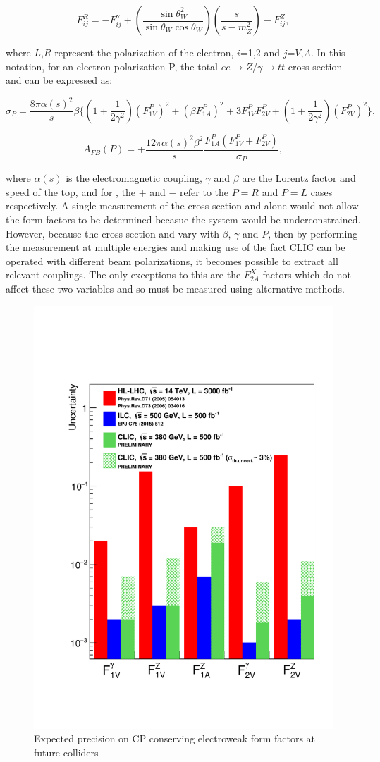 \begin{equation}
F_{ij}^{R} = -F_{ij}^{\gamma} +(\frac{\sin\theta_W^2}{\sin\theta_W\cos\theta_W})(\frac{s}{s-m_Z^2}) -F_{ij}^{Z},
\end{equation}

where $L$,$R$ represent the polarization of the electron, $i$=1,2 and $j$=$V$,$A$. In this notation, for an electron polarization P, the total $ee\rightarrow Z/\gamma\rightarrow tt$ cross section and \afb can be expressed as:

\begin{equation}
\sigma_P = \frac{8\pi\alpha(s)^2}{s}\beta \{(1 + \frac{1}{2\gamma^2})(F_{1V}^P)^2 +(\beta F_{1A}^P)^2 +3F_{1V}^P F_{2V}^P + (1 + \frac{1}{2\gamma^2})(F_{2V}^P)^2\},
\end{equation}

\begin{equation}
\label{eq:afbFormFactors}
A_{FB}(P) = \mp \frac{12\pi\alpha(s)^2 \beta^2}{s}\frac{F_{1A}^P(F_{1V}^P +F_{2V}^P)}{\sigma_P},
\end{equation}

where $\alpha(s)$  is the electromagnetic coupling, $\gamma$ and $\beta$ are the Lorentz factor and speed of the top, and for , the $+$ and $-$ refer to the $P=R$ and $P=L$ cases respectively. A single measurement of the cross section and \afb alone would not allow the form factors to be determined becasue the system would be underconstrained. However, because the cross section and \afb vary with $\beta$, $\gamma$ and $P$, then by performing the measurement at multiple energies and making use of the fact \ac{CLIC} can be operated with different beam polarizations, it becomes possible to extract all relevant couplings. The only exceptions to this are the $F_{2A}^X$ factors which do not affect these two variables and so must be measured using alternative methods. 

\begin{figure}
\centering
\includegraphics[width=0.45\linewidth]{Theory/fig/FormFactorsTopCLIC380.pdf}
\caption[Expected precision on CP conserving electroweak form factors at future colliders]{Expected precision on CP conserving electroweak form factors at future colliders \cite{CLIC:2016zwp}}
\label{fig:CPConserving}
\end{figure}

